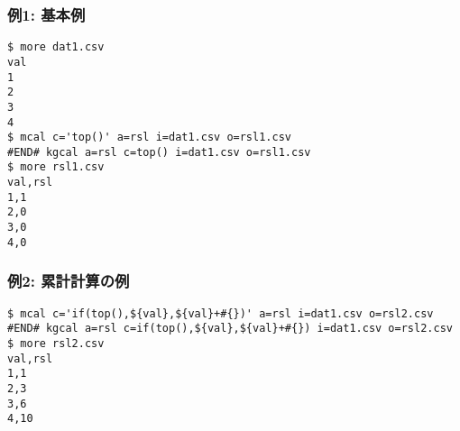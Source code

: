 \subsubsection*{例1: 基本例}



\begin{Verbatim}[baselinestretch=0.7,frame=single]
$ more dat1.csv
val
1
2
3
4
$ mcal c='top()' a=rsl i=dat1.csv o=rsl1.csv
#END# kgcal a=rsl c=top() i=dat1.csv o=rsl1.csv
$ more rsl1.csv
val,rsl
1,1
2,0
3,0
4,0
\end{Verbatim}
\subsubsection*{例2: 累計計算の例}



\begin{Verbatim}[baselinestretch=0.7,frame=single]
$ mcal c='if(top(),${val},${val}+#{})' a=rsl i=dat1.csv o=rsl2.csv
#END# kgcal a=rsl c=if(top(),${val},${val}+#{}) i=dat1.csv o=rsl2.csv
$ more rsl2.csv
val,rsl
1,1
2,3
3,6
4,10
\end{Verbatim}
